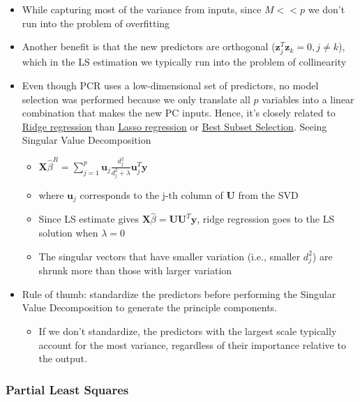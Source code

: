 \documentclass[
]{book}
\providecommand{\tightlist}{%
  \setlength{\itemsep}{0pt}\setlength{\parskip}{0pt}}
\begin{document}
\begin{itemize}
\item
  While capturing most of the variance from inputs, since \(M <<p\) we don't run into the problem of overfitting
\item
  Another benefit is that the new predictors are orthogonal (\(\mathbf{z}^T_j \mathbf{z}_k =0, j \neq k\)), which in the LS estimation we typically run into the problem of collinearity
\item
  Even though PCR uses a low-dimensional set of predictors, no model selection was performed because we only translate all \(p\) variables into a linear combination that makes the new PC inputs. Hence, it's closely related to \protect\hyperlink{ridge-regression}{Ridge regression} than \protect\hyperlink{lasso-regression}{Lasso regression} or \protect\hyperlink{best-subset-selection}{Best Subset Selection}. Seeing Singular Value Decomposition

  \begin{itemize}
  \item
    \(\mathbf{X}\hat{\beta}^R = \sum_{j=1}^p \mathbf{u}_j \frac{d_j^2}{d_j^2+ \lambda}\mathbf{u}_j^T \mathbf{y}\)
  \item
    where \(\mathbf{u}_j\) corresponds to the j-th column of \(\mathbf{U}\) from the SVD
  \item
    Since LS estimate gives \(\mathbf{X}\hat{\beta} = \mathbf{UU}^T \mathbf{y}\), ridge regression goes to the LS solution when \(\lambda = 0\)
  \item
    The singular vectors that have smaller variation (i.e., smaller \(d_j^2\)) are shrunk more than those with larger variation
  \end{itemize}
\item
  Rule of thumb: standardize the predictors before performing the Singular Value Decomposition to generate the principle components.

  \begin{itemize}
  \tightlist
  \item
    If we don't standardize, the predictors with the largest scale typically account for the most variance, regardless of their importance relative to the output.
  \end{itemize}
\end{itemize}

\hypertarget{partial-least-squares}{%
\subsubsection{Partial Least Squares}\label{partial-least-squares}}
\end{document}
